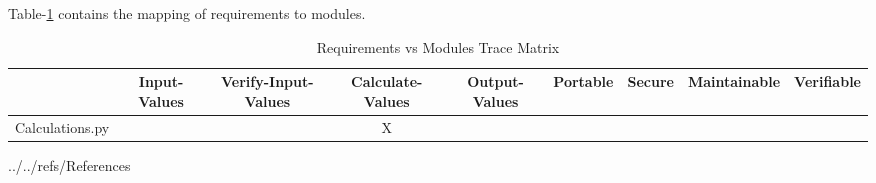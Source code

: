 \documentclass[12pt, titlepage]{article}
\begin{document}
Table-\ref{tblTrace2} contains the mapping of requirements to modules.
  
\begin{table}[]
\begin{adjustbox}{width=1.29\textwidth}
\begin{tabular}{c|c|c|c|c|c|c|c|c|}
 & Input-Values & Verify-Input-Values & Calculate-Values & Output-Values & Portable & Secure & Maintainable & Verifiable \\ \hline
Calculations.py &  &  & X  &   &  &  &  &  \\
\end{tabular}
\end{adjustbox}
\caption{Requirements vs Modules Trace Matrix}
\label{tblTrace2}
\end{table}



 {../../refs/References}







\end{document}
